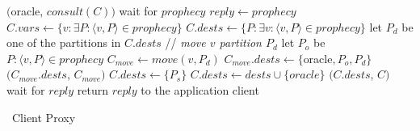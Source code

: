\begin{algorithm}[h!]
\small

\begin{distribalgo}[1]

\vspace{1.0mm}


\vspace{1.0mm}

        \STATE \amcast$($oracle, $consult(C))$
        \STATE wait for $prophecy$
            \STATE $reply \leftarrow prophecy$
        \ELSE
            \STATE $C.vars \leftarrow \{v: \exists P : \langle v, P \rangle \in prophecy \}$
            \STATE $C.dests \leftarrow \{P: \exists v : \langle v, P \rangle \in prophecy \}$
                \STATE let $P_d$ be one of the partitions in $C.dests$
                    \STATE // \textit{move $v$ partition $P_d$}
                    \STATE let $P_o$ be $P : \langle v, P \rangle \in prophecy$
                        \STATE $C_{move} \leftarrow move(v,P_d)$
                        \STATE $C_{move}.dests \leftarrow \{$oracle$,P_o,P_d\}$    
                        \STATE \amcast$(C_{move}.dests$, $C_{move})$
                    \ENDIF
                \ENDFOR
                \STATE $C.dests \leftarrow \{ P_s \}$
            \ENDIF
                \STATE $C.dests \leftarrow dests \cup \{oracle\}$
            \ENDIF
            \STATE \amcast$(C.dests$, $C)$
            \STATE wait for $reply$
        \ENDIF
    \ENDINDENT
    \STATE return $reply$ to the application client
\ENDINDENT

\caption{\dssmr\ Client Proxy}
\label{alg:client_proxy}
\end{distribalgo}
\end{algorithm}
